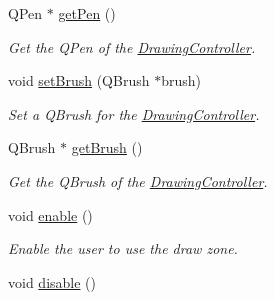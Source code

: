 \begin{DoxyCompactItemize}
Q\+Pen $\ast$ \hyperlink{classDrawingController_a721091648ea9ec6c04a95cd8e75aaa92}{get\+Pen} ()
\begin{DoxyCompactList}\small\item\em Get the Q\+Pen of the \hyperlink{classDrawingController}{Drawing\+Controller}. \end{DoxyCompactList}\item 
void \hyperlink{classDrawingController_ac0d2a51a08a28d7011580a481a8b1c7c}{set\+Brush} (Q\+Brush $\ast$brush)
\begin{DoxyCompactList}\small\item\em Set a Q\+Brush for the \hyperlink{classDrawingController}{Drawing\+Controller}. \end{DoxyCompactList}\item 
Q\+Brush $\ast$ \hyperlink{classDrawingController_ac3a86bd08e93e1d8fff277ee157f6bf9}{get\+Brush} ()
\begin{DoxyCompactList}\small\item\em Get the Q\+Brush of the \hyperlink{classDrawingController}{Drawing\+Controller}. \end{DoxyCompactList}\item 
\hypertarget{classDrawingController_abf493e3f30c6f6c38ea938363c465dde}{}void \hyperlink{classDrawingController_abf493e3f30c6f6c38ea938363c465dde}{enable} ()\label{classDrawingController_abf493e3f30c6f6c38ea938363c465dde}

\begin{DoxyCompactList}\small\item\em Enable the user to use the draw zone. \end{DoxyCompactList}\item 
\hypertarget{classDrawingController_aa48ee94920f3c13118601ca77170f833}{}void \hyperlink{classDrawingController_aa48ee94920f3c13118601ca77170f833}{disable} ()\label{classDrawingController_aa48ee94920f3c13118601ca77170f833}


\end{DoxyCompactItemize}
